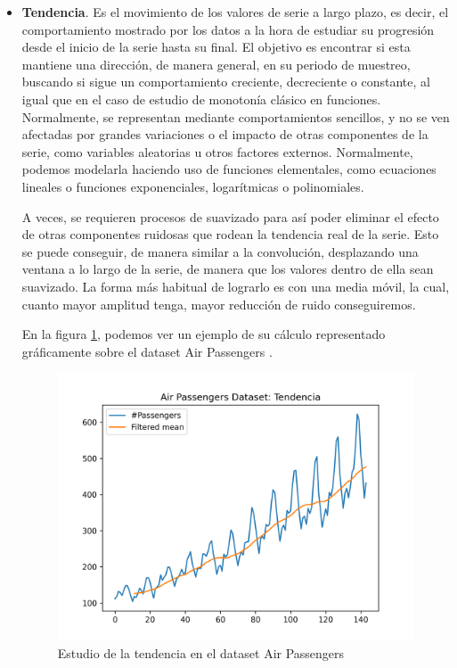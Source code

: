 \begin{itemize}
	\item \textbf{Tendencia}. Es el movimiento de los valores de serie a largo plazo, es decir, el comportamiento mostrado por los datos a la hora de estudiar su progresión desde el inicio de la serie hasta su final. El objetivo es encontrar si esta mantiene una dirección, de manera general, en su periodo de muestreo, buscando si sigue un comportamiento creciente, decreciente o constante, al igual que en el caso de estudio de monotonía clásico en funciones. Normalmente, se representan mediante comportamientos sencillos, y no se ven afectadas por grandes variaciones o el impacto de otras componentes de la serie, como variables aleatorias u otros factores externos. Normalmente, podemos modelarla haciendo uso de funciones elementales, como ecuaciones lineales o funciones exponenciales, logarítmicas o polinomiales.
			
	A veces, se requieren procesos de suavizado para así poder eliminar el efecto de otras componentes ruidosas que rodean la tendencia real de la serie. Esto se puede conseguir, de manera similar a la convolución, desplazando una ventana a lo largo de la serie, de manera que los valores dentro de ella sean suavizado. La forma más habitual de lograrlo es con una media móvil, la cual, cuanto mayor amplitud tenga, mayor reducción de ruido conseguiremos.
	
	En la figura \ref{trend}, podemos ver un ejemplo de su cálculo representado gráficamente sobre el dataset Air Passengers \cite{box1976time}.
	
	\begin{figure}[h] %
		\centering
		\includegraphics[scale=0.6]{img/trend}
		\caption{Estudio de la tendencia en el dataset Air Passengers}
		\label{trend}
	\end{figure}  	
	

\end{itemize}
